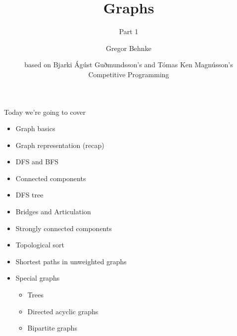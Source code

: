 \documentclass[12pt,t]{beamer}
\title{Graphs}
\subtitle{Part 1}
\author{Gregor Behnke}
\institute{Institute of Artificial Intelligence\\ Ulm University}
\date{\tiny based on Bjarki Ágúst Guðmundsson's and Tómas Ken Magnússon's\\Competitive Programming}
\newcommand{\bi}{\begin{itemize}}
\newcommand{\ei}{\end{itemize}}
\begin{document}
{
    \frame{
        \titlepage
    }
}

\begin{frame}{Today we're going to cover}
    \vspace{10pt}
    \bi
        \item Graph basics
        \item Graph representation (recap)
        \item DFS and BFS
        \item Connected components
        \item DFS tree
        \item Bridges and Articulation
        \item Strongly connected components
        \item Topological sort
        \item Shortest paths in unweighted graphs
        \item Special graphs
            \bi
                \item Trees
                \item Directed acyclic graphs
                \item Bipartite graphs
            \ei
    \ei
\end{frame}
\end{document}
